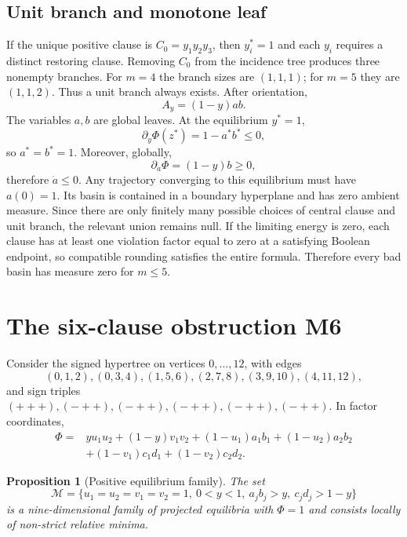 \documentclass[11pt,a4paper]{article}
\newtheorem{proposition}[theorem]{Proposition}
\newcommand{\Mmot}{\mathcal M}
\begin{document}
\subsection{Unit branch and monotone leaf}
If the unique positive clause is $C_0=y_1y_2y_3$, then $y_i^*=1$ and each $y_i$ requires a distinct restoring clause. Removing $C_0$ from the incidence tree produces three nonempty branches. For $m=4$ the branch sizes are $(1,1,1)$; for $m=5$ they are $(1,1,2)$. Thus a unit branch always exists. After orientation,
\begin{equation}
A_y=(1-y)ab.
\end{equation}
The variables $a,b$ are global leaves. At the equilibrium $y^*=1$,
\[
\partial_y\Phi(z^*)=1-a^*b^*\le0,
\]
so $a^*=b^*=1$. Moreover, globally,
\begin{equation}
\partial_a\Phi=(1-y)b\ge0,
\end{equation}
therefore $\dot a\le0$. Any trajectory converging to this equilibrium must have $a(0)=1$. Its basin is contained in a boundary hyperplane and has zero ambient measure. Since there are only finitely many possible choices of central clause and unit branch, the relevant union remains null. If the limiting energy is zero, each clause has at least one violation factor equal to zero at a satisfying Boolean endpoint, so compatible rounding satisfies the entire formula. Therefore every bad basin has measure zero for $m\le5$.

\section{The six-clause obstruction M6}
Consider the signed hypertree on vertices $0,\ldots,12$, with edges
\[
(0,1,2),(0,3,4),(1,5,6),(2,7,8),(3,9,10),(4,11,12),
\]
and sign triples $(+++),(-++),(-++),(-++),(-++),(-++)$. In factor coordinates,
\begin{align}
\Phi={}&yu_1u_2+(1-y)v_1v_2+(1-u_1)a_1b_1+(1-u_2)a_2b_2\\
&+(1-v_1)c_1d_1+(1-v_2)c_2d_2.
\end{align}

\begin{proposition}[Positive equilibrium family]
The set
\[
\Mmot=\{u_1=u_2=v_1=v_2=1,\ 0<y<1,\ a_jb_j>y,\ c_jd_j>1-y\}
\]
is a nine-dimensional family of projected equilibria with $\Phi=1$ and consists locally of non-strict relative minima.
\end{proposition}
\end{document}
